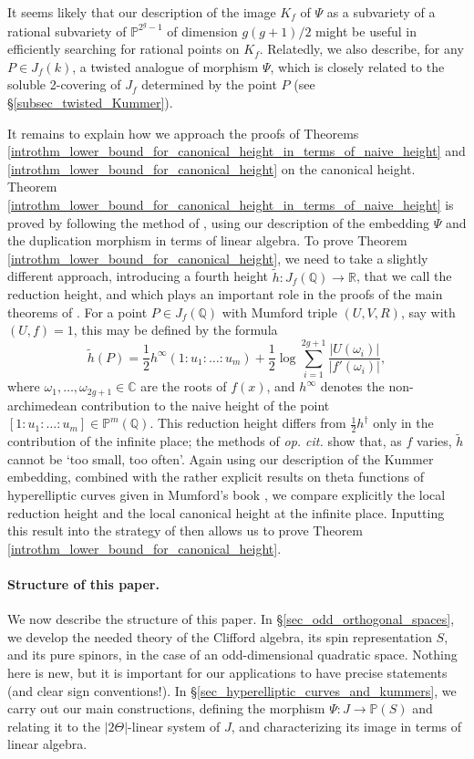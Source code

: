 \documentclass{article} %
\numberwithin{equation}{section}
\renewcommand{\P}{\mathbb{P}}
\newcommand{\R}{\mathbb{R}}
\newcommand{\Q}{\mathbb{Q}}
\newcommand{\bC}{\mathbb{C}}
\begin{document}
It seems likely that our description of the image $K_f$ of $\Psi$ as a subvariety of a rational subvariety of $\P^{2^g-1}$ of dimension $g(g+1)/2$ might be useful in efficiently searching for rational points on $K_f$. Relatedly, we also describe, for any $P \in J_f(k)$, a twisted analogue of morphism $\Psi$, which is closely related to the soluble 2-covering of $J_f$ determined by the point $P$ (see \S \ref{subsec_twisted_Kummer}). 

It remains to explain how we approach the proofs of Theorems \ref{introthm_lower_bound_for_canonical_height_in_terms_of_naive_height} and \ref{introthm_lower_bound_for_canonical_height} on the canonical height. Theorem \ref{introthm_lower_bound_for_canonical_height_in_terms_of_naive_height} is proved by following the method of \cite{Sto99}, using our description of the embedding $\Psi$ and the duplication morphism in terms of linear algebra. To prove Theorem \ref{introthm_lower_bound_for_canonical_height}, we need to take a slightly different approach, introducing a fourth height $\widetilde{h} : J_f(\Q) \to \R$, that we call the reduction height, and which plays an important role in the proofs of the main theorems of \cite{lagathorne2024smallheightoddhyperelliptic}. For a point $P \in J_f(\Q)$ with Mumford triple $(U, V, R)$, say with $(U, f) = 1$, this may be defined by the formula
\[ \widetilde{h}(P) = \frac{1}{2} h^\infty( 1 : u_1 : \dots : u_m) + \frac{1}{2} \log \sum_{i=1}^{2g+1} \frac{ |U(\omega_i)|}{|f'(\omega_i)|}, \]
where $\omega_1, \dots, \omega_{2g+1} \in \bC$ are the roots of $f(x)$, and $h^\infty$ denotes the non-archimedean contribution to the naive height of the point $[1 : u_1 : \dots : u_m]\in \P^m(\Q)$. This reduction height differs from $\frac{1}{2} h^\dagger$ only in the contribution of the infinite place; the methods of \emph{op. cit.} show that, as $f$ varies, $\widetilde{h}$ cannot be `too small, too often'. Again using our description of the Kummer embedding, combined with the rather explicit results on theta functions of hyperelliptic curves given in Mumford's book \cite{MumfordTataII}, we compare explicitly the local reduction height and the local canonical height at the infinite place. Inputting this result into the strategy of \cite{lagathorne2024smallheightoddhyperelliptic} then allows us to prove Theorem \ref{introthm_lower_bound_for_canonical_height}. 



\paragraph{Structure of this paper.}  We now describe the structure of this paper. In \S \ref{sec_odd_orthogonal_spaces}, we develop the needed theory of the Clifford algebra, its spin representation $S$, and its pure spinors, in the case of an odd-dimensional quadratic space. Nothing here is new, but it is important for our applications to have precise statements (and clear sign conventions!). In \S \ref{sec_hyperelliptic_curves_and_kummers}, we carry out our main constructions, defining the morphism $\Psi : J \to \P(S)$ and relating it to the $|2 \Theta|$-linear system of $J$, and characterizing its image in terms of linear algebra. 
\end{document}
